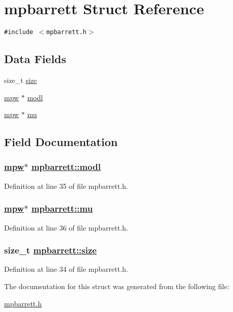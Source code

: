 \hypertarget{structmpbarrett}{
\section{mpbarrett Struct Reference}
\label{structmpbarrett}
}
{\tt \#include $<$mpbarrett.h$>$}

\subsection*{Data Fields}
\begin{CompactItemize}
\item 
size\_\-t \hyperlink{structmpbarrett_o0}{size}
\item 
\hyperlink{beecrypt_8api_8h_a9}{mpw} $\ast$ \hyperlink{structmpbarrett_o1}{modl}
\item 
\hyperlink{beecrypt_8api_8h_a9}{mpw} $\ast$ \hyperlink{structmpbarrett_o2}{mu}
\end{CompactItemize}


\subsection{Field Documentation}
\hypertarget{structmpbarrett_o1}{
\subsubsection[modl]{\setlength{\rightskip}{0pt plus 5cm}\hyperlink{beecrypt_8api_8h_a9}{mpw}$\ast$ \hyperlink{structmpbarrett_o1}{mpbarrett::modl}}}
\label{structmpbarrett_o1}


Definition at line 35 of file mpbarrett.h.\hypertarget{structmpbarrett_o2}{
\subsubsection[mu]{\setlength{\rightskip}{0pt plus 5cm}\hyperlink{beecrypt_8api_8h_a9}{mpw}$\ast$ \hyperlink{structmpbarrett_o2}{mpbarrett::mu}}}
\label{structmpbarrett_o2}


Definition at line 36 of file mpbarrett.h.\hypertarget{structmpbarrett_o0}{
\subsubsection[size]{\setlength{\rightskip}{0pt plus 5cm}size\_\-t \hyperlink{structmpbarrett_o0}{mpbarrett::size}}}
\label{structmpbarrett_o0}


Definition at line 34 of file mpbarrett.h.

The documentation for this struct was generated from the following file:\begin{CompactItemize}
\item 
\hyperlink{mpbarrett_8h}{mpbarrett.h}\end{CompactItemize}

